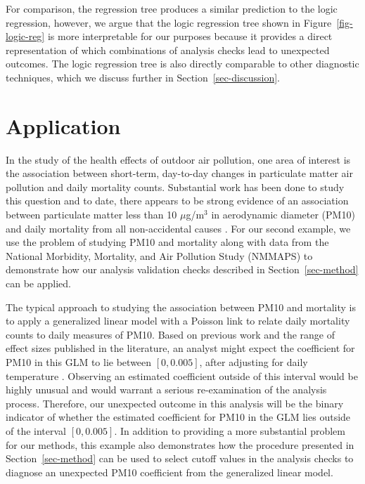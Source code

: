 \documentclass[
  12pt,
]{interact}
\begin{document}
For comparison, the regression tree produces a similar prediction to the
logic regression, however, we argue that the logic regression tree shown
in Figure~\ref{fig-logic-reg} is more interpretable for our purposes
because it provides a direct representation of which combinations of
analysis checks lead to unexpected outcomes. The logic regression tree
is also directly comparable to other diagnostic techniques, which we
discuss further in Section~\ref{sec-discussion}.

\section{Application}\label{sec-pm10-mortality}

In the study of the health effects of outdoor air pollution, one area of
interest is the association between short-term, day-to-day changes in
particulate matter air pollution and daily mortality counts. Substantial
work has been done to study this question and to date, there appears to
be strong evidence of an association between particulate matter less
than 10 \(\mu\)g/m\(^3\) in aerodynamic diameter (PM10) and daily
mortality from all non-accidental causes \citep{samet2000fine}. For our
second example, we use the problem of studying PM10 and mortality along
with data from the National Morbidity, Mortality, and Air Pollution
Study (NMMAPS) to demonstrate how our analysis validation checks
described in Section~\ref{sec-method} can be applied.

The typical approach to studying the association between PM10 and
mortality is to apply a generalized linear model with a Poisson link to
relate daily mortality counts to daily measures of PM10. Based on
previous work and the range of effect sizes published in the literature,
an analyst might expect the coefficient for PM10 in this GLM to lie
between \([0, 0.005]\), after adjusting for daily temperature
\citep{samet200fine, welty2005acute}. Observing an estimated coefficient
outside of this interval would be highly unusual and would warrant a
serious re-examination of the analysis process. Therefore, our
unexpected outcome in this analysis will be the binary indicator of
whether the estimated coefficient for PM10 in the GLM lies outside of
the interval \([0, 0.005]\). In addition to providing a more substantial
problem for our methods, this example also demonstrates how the
procedure presented in Section~\ref{sec-method} can be used to select
cutoff values in the analysis checks to diagnose an unexpected PM10
coefficient from the generalized linear model.
\end{document}
